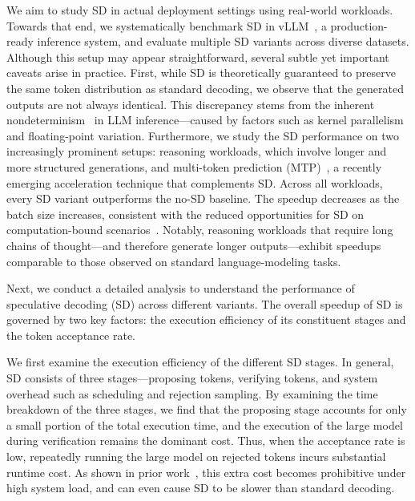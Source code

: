 We aim to study SD in actual deployment settings using real-world workloads. Towards that end, we systematically benchmark SD in vLLM~\cite{kwon2023efficient}, a production-ready inference system, and evaluate multiple SD variants across diverse datasets. 
Although this setup may appear straightforward, several subtle yet important caveats arise in practice. %
First, while SD is theoretically guaranteed to preserve the same token distribution as standard decoding, we observe that the generated outputs are not always identical. This discrepancy stems from the inherent nondeterminism~\cite{he2025nondeterminism} in LLM inference—caused by factors such as kernel parallelism and floating-point variation. 
Furthermore, we study the SD performance on two increasingly prominent setups: reasoning workloads, which involve longer and more structured generations, and multi-token prediction (MTP)~\cite{deepseekai2025deepseekv3technicalreport, 5team2025glm45agenticreasoningcoding}, a recently emerging acceleration technique that complements SD.
Across all workloads, every SD variant outperforms the no-SD baseline. The speedup decreases as the batch size increases, consistent with the reduced opportunities for SD on computation-bound scenarios~\cite{liu2024dsd}. Notably, reasoning workloads that require long chains of thought—and therefore generate longer outputs—exhibit speedups comparable to those observed on standard language-modeling tasks.

Next, we conduct a detailed analysis to understand the performance of speculative decoding (SD) across different variants. The overall speedup of SD is governed by two key factors: the execution efficiency of its constituent stages and the token acceptance rate.

We first examine the execution efficiency of the different SD stages.
In general, SD consists of three stages---proposing tokens, verifying tokens, and system overhead such as scheduling and rejection sampling. 
By examining the time breakdown of the three stages, we find that the proposing stage accounts for only a small portion of the total execution time, and the execution of the large model during verification remains the dominant cost. Thus, when the acceptance rate is low, repeatedly running the large model on rejected tokens incurs substantial runtime cost. As shown in prior work~\cite{liu2024dsd}, this extra cost becomes prohibitive under high system load, and can even cause SD to be slower than standard decoding.

